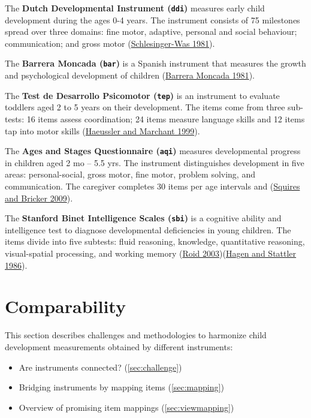 \documentclass[
]{book}
\providecommand{\tightlist}{%
  \setlength{\itemsep}{0pt}\setlength{\parskip}{0pt}}
\begin{document}
The \textbf{Dutch Developmental Instrument (\texttt{ddi})} measures early child development during the ages 0-4 years. The instrument consists of 75 milestones spread over three domains: fine motor, adaptive, personal and social behaviour; communication; and gross motor (\protect\hyperlink{ref-schlesinger1981}{Schlesinger-Was 1981}).

The \textbf{Barrera Moncada (\texttt{bar})} is a Spanish instrument that measures the growth and psychological development of children (\protect\hyperlink{ref-barrera1981}{Barrera Moncada 1981}).

The \textbf{Test de Desarrollo Psicomotor (\texttt{tep})} is an instrument to evaluate toddlers aged 2 to 5 years on their development. The items come from three sub-tests: 16 items assess coordination; 24 items measure language skills and 12 items tap into motor skills (\protect\hyperlink{ref-haeussler1999}{Haeussler and Marchant 1999}).

The \textbf{Ages and Stages Questionnaire (\texttt{aqi})} measures developmental progress in children aged 2 mo -- 5.5 yrs. The instrument distinguishes development in five areas: personal-social, gross motor, fine motor, problem solving, and communication. The caregiver completes 30 items per age intervals and (\protect\hyperlink{ref-squires2009}{Squires and Bricker 2009}).

The \textbf{Stanford Binet Intelligence Scales (\texttt{sbi})} is a cognitive ability and intelligence test to diagnose developmental deficiencies in young children. The items divide into five subtests: fluid reasoning, knowledge, quantitative reasoning, visual-spatial processing, and working memory (\protect\hyperlink{ref-roid2003}{Roid 2003})(\protect\hyperlink{ref-hagen1986}{Hagen and Stattler 1986}).

\hypertarget{ch:comparability}{%
\chapter{Comparability}\label{ch:comparability}}

This section describes challenges and methodologies to harmonize child development measurements obtained by different instruments:

\begin{itemize}
\tightlist
\item
  Are instruments connected? (\ref{sec:challenge})
\item
  Bridging instruments by mapping items (\ref{sec:mapping})
\item
  Overview of promising item mappings (\ref{sec:viewmapping})
\end{itemize}
\end{document}
